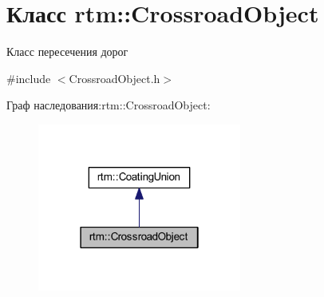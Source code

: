 \hypertarget{classrtm_1_1_crossroad_object}{}\section{Класс rtm\+:\+:Crossroad\+Object}
\label{classrtm_1_1_crossroad_object}


Класс пересечения дорог  




{\ttfamily \#include $<$Crossroad\+Object.\+h$>$}



Граф наследования\+:rtm\+:\+:Crossroad\+Object\+:
\nopagebreak
\begin{figure}[H]
\begin{center}
\leavevmode
\includegraphics[width=190pt]{classrtm_1_1_crossroad_object__inherit__graph}
\end{center}
\end{figure}
